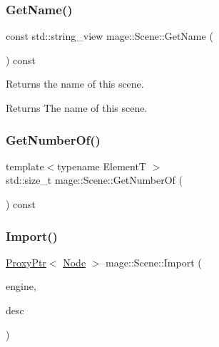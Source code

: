 \mbox{\label{classmage_1_1_scene_a0ef75ab12ff3b6b2d22798f40ba7d1c5}} 
\subsubsection{\texorpdfstring{Get\+Name()}{GetName()}}
{\footnotesize\ttfamily const std\+::string\+\_\+view mage\+::\+Scene\+::\+Get\+Name (\begin{DoxyParamCaption}{ }\end{DoxyParamCaption}) const\hspace{0.3cm}{\ttfamily [noexcept]}}

Returns the name of this scene.

\begin{DoxyReturn}{Returns}
The name of this scene. 
\end{DoxyReturn}
\mbox{\label{classmage_1_1_scene_a293dcd3f77701f22c66d053eb0a4cc0f}} 
\subsubsection{\texorpdfstring{Get\+Number\+Of()}{GetNumberOf()}}
{\footnotesize\ttfamily template$<$typename ElementT $>$ \\
std\+::size\+\_\+t mage\+::\+Scene\+::\+Get\+Number\+Of (\begin{DoxyParamCaption}{ }\end{DoxyParamCaption}) const\hspace{0.3cm}{\ttfamily [noexcept]}}

\mbox{\label{classmage_1_1_scene_a03490fe422fdfa110a6d3b58c31d1bb4}} 
\subsubsection{\texorpdfstring{Import()}{Import()}\hspace{0.1cm}{\footnotesize\ttfamily [1/2]}}
{\footnotesize\ttfamily \mbox{\hyperlink{classmage_1_1_proxy_ptr}{Proxy\+Ptr}}$<$ \mbox{\hyperlink{classmage_1_1_node}{Node}} $>$ mage\+::\+Scene\+::\+Import (\begin{DoxyParamCaption}\item[{\mbox{\hyperlink{classmage_1_1_engine}{Engine}} \&}]{engine,  }\item[{const \mbox{\hyperlink{classmage_1_1rendering_1_1_model_descriptor}{rendering\+::\+Model\+Descriptor}} \&}]{desc }\end{DoxyParamCaption})}

